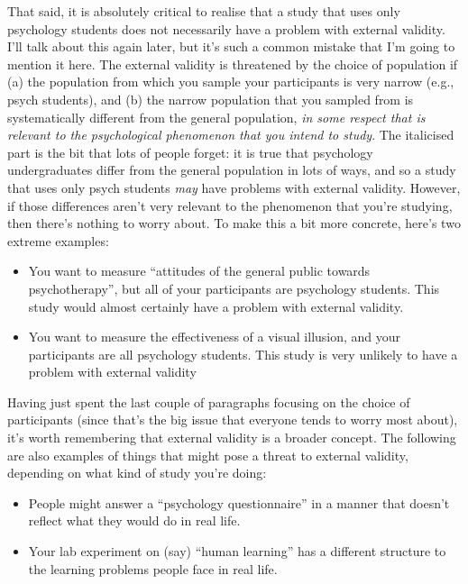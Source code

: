 \documentclass[]{book}
\providecommand{\tightlist}{%
  \setlength{\itemsep}{0pt}\setlength{\parskip}{0pt}}
\begin{document}
That said, it is absolutely critical to realise that a study that uses only psychology students does not necessarily have a problem with external validity. I'll talk about this again later, but it's such a common mistake that I'm going to mention it here. The external validity is threatened by the choice of population if (a) the population from which you sample your participants is very narrow (e.g., psych students), and (b) the narrow population that you sampled from is systematically different from the general population, \emph{in some respect that is relevant to the psychological phenomenon that you intend to study}. The italicised part is the bit that lots of people forget: it is true that psychology undergraduates differ from the general population in lots of ways, and so a study that uses only psych students \emph{may} have problems with external validity. However, if those differences aren't very relevant to the phenomenon that you're studying, then there's nothing to worry about. To make this a bit more concrete, here's two extreme examples:

\begin{itemize}
\tightlist
\item
  You want to measure ``attitudes of the general public towards psychotherapy'', but all of your participants are psychology students. This study would almost certainly have a problem with external validity.
\item
  You want to measure the effectiveness of a visual illusion, and your participants are all psychology students. This study is very unlikely to have a problem with external validity
\end{itemize}

Having just spent the last couple of paragraphs focusing on the choice of participants (since that's the big issue that everyone tends to worry most about), it's worth remembering that external validity is a broader concept. The following are also examples of things that might pose a threat to external validity, depending on what kind of study you're doing:

\begin{itemize}
\tightlist
\item
  People might answer a ``psychology questionnaire'' in a manner that doesn't reflect what they would do in real life.
\item
  Your lab experiment on (say) ``human learning'' has a different structure to the learning problems people face in real life.
\end{itemize}
\end{document}
